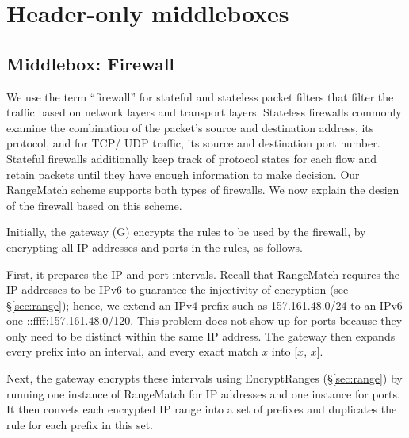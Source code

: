 

\section{Header-only middleboxes}




\subsection{Middlebox: Firewall}\label{sec:firewall}


We use the term ``firewall'' for stateful and stateless packet filters that filter the traffic based on network layers and transport layers. Stateless firewalls commonly examine the combination of the packet's source and destination address, its protocol, and for TCP/ UDP traffic, its source and destination port number. Stateful firewalls additionally keep track of protocol states for each flow and retain packets until they have enough information to make decision. 
Our RangeMatch scheme supports both types of firewalls. We now explain the design of the firewall based on this scheme.

 Initially, the gateway (G) encrypts the rules to be used by the firewall, by encrypting all IP addresses and ports in the rules, as follows.

First, it prepares the IP and port intervals. Recall that RangeMatch requires the IP addresses to be IPv6 to guarantee the injectivity of encryption (see \S\ref{sec:range}); hence, we extend an IPv4 prefix  such as 157.161.48.0/24 to an IPv6 one  ::ffff:157.161.48.0/120. 
 This problem does not show up for ports because they only need to be distinct within the same IP address.
The gateway then expands every prefix into an interval, and every exact match $x$ into [$x$, $x$]. 

Next, the gateway encrypts these intervals using EncryptRanges (\S\ref{sec:range}) by running one instance of RangeMatch for IP addresses and one instance for ports.
It then convets each encrypted IP range into a set of prefixes and duplicates the rule for each prefix in this set. 

